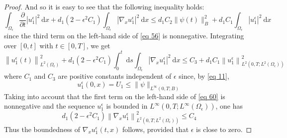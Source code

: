 \begin{proof}
And so it is easy to see that the following inequality holds:
\begin{equation}
\int_{\Omega_{\epsilon}} \frac{\partial}{\partial t}\left|u_{1}^{\epsilon}\right|^{2} \mathrm{~d} x+d_{1}\left(2-\epsilon^{2} C_{1}\right) \int_{\Omega_{\epsilon}}\left|\nabla_{x} u_{1}^{\epsilon}\right|^{2} \mathrm{~d} x\leq d_{1} C_{2}\|\psi(t)\|_{B}^{2}+d_{1} C_{1} \int_{\Omega_{\epsilon}}\left|u_{1}^{\epsilon}\right|^{2} \mathrm{~d} x
\label{eq 59}\end{equation}
since the third term on the left-hand side of \eqref{eq 56} is nonnegative. Integrating over $[0, t]$ with $t \in[0, T]$, we get
\begin{equation}
  \left\|u_{1}^{\epsilon}(t)\right\|_{L^{2}\left(\Omega_{\epsilon}\right)}^{2}+d_{1}\left(2-\epsilon^{2} C_{1}\right) \int_{0}^{t} \mathrm{~d} s \int_{\Omega_{\epsilon}}\left|\nabla_{x} u_{1}^{\epsilon}\right|^{2} \mathrm{~d} x \leq C_{3}+d_{1} C_{1}\left\|u_{1}^{\epsilon}\right\|_{L^{2}\left(0, T ; L^{2}\left(\Omega_{\epsilon}\right)\right)}^{2}
\label{eq 60}\end{equation}
where $C_{1}$ and $C_{3}$ are positive constants independent of $\epsilon$ since, by \eqref{eq 11},
$$
u_{1}^{\epsilon}(0, x)=U_{1} \leq\|\psi\|_{L^{\infty}(0, T ; B)}
$$
Taking into account that the first term on the left-hand side of \eqref{eq 60} is nonnegative and the sequence $u_{1}^{\epsilon}$ is bounded in $L^{\infty}\left(0, T ; L^{\infty}\left(\Omega_{\epsilon}\right)\right)$, one has
\begin{equation}
  d_{1}\left(2-\epsilon^{2} C_{1}\right)\left\|\nabla_{x} u_{1}^{\epsilon}\right\|_{L^{2}\left(0, T ; L^{2}\left(\Omega_{\epsilon}\right)\right)}^{2} \leq C_{4}
\label{eq 61}\end{equation}
Thus the boundedness of $\nabla_{x} u_{1}^{\epsilon}(t, x)$ follows, provided that $\epsilon$ is close to zero.
\end{proof} 
